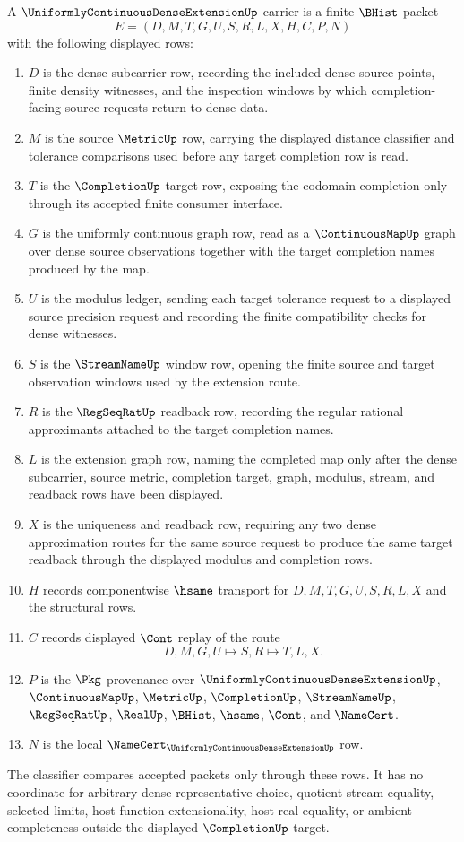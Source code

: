 \begin{definition}
\label{def:uniformly-continuous-dense-extension-carrier}
A $\UniformlyContinuousDenseExtensionUp$ carrier is a finite $\BHist$ packet
$$
E=(D,M,T,G,U,S,R,L,X,H,C,P,N)
$$
with the following displayed rows:
\begin{enumerate}
\item $D$ is the dense subcarrier row, recording the included dense source points, finite density witnesses, and the inspection windows by which completion-facing source requests return to dense data.
\item $M$ is the source $\MetricUp$ row, carrying the displayed distance classifier and tolerance comparisons used before any target completion row is read.
\item $T$ is the $\CompletionUp$ target row, exposing the codomain completion only through its accepted finite consumer interface.
\item $G$ is the uniformly continuous graph row, read as a $\ContinuousMapUp$ graph over dense source observations together with the target completion names produced by the map.
\item $U$ is the modulus ledger, sending each target tolerance request to a displayed source precision request and recording the finite compatibility checks for dense witnesses.
\item $S$ is the $\StreamNameUp$ window row, opening the finite source and target observation windows used by the extension route.
\item $R$ is the $\RegSeqRatUp$ readback row, recording the regular rational approximants attached to the target completion names.
\item $L$ is the extension graph row, naming the completed map only after the dense subcarrier, source metric, completion target, graph, modulus, stream, and readback rows have been displayed.
\item $X$ is the uniqueness and readback row, requiring any two dense approximation routes for the same source request to produce the same target readback through the displayed modulus and completion rows.
\item $H$ records componentwise $\hsame$ transport for $D,M,T,G,U,S,R,L,X$ and the structural rows.
\item $C$ records displayed $\Cont$ replay of the route
$$
D,M,G,U \longmapsto S,R \longmapsto T,L,X .
$$
\item $P$ is the $\Pkg$ provenance over $\UniformlyContinuousDenseExtensionUp$, $\ContinuousMapUp$, $\MetricUp$, $\CompletionUp$, $\StreamNameUp$, $\RegSeqRatUp$, $\RealUp$, $\BHist$, $\hsame$, $\Cont$, and $\NameCert$.
\item $N$ is the local $\NameCert_{\UniformlyContinuousDenseExtensionUp}$ row.
\end{enumerate}
The classifier compares accepted packets only through these rows. It has no coordinate for arbitrary dense representative choice, quotient-stream equality, selected limits, host function extensionality, host real equality, or ambient completeness outside the displayed $\CompletionUp$ target.
\end{definition}

